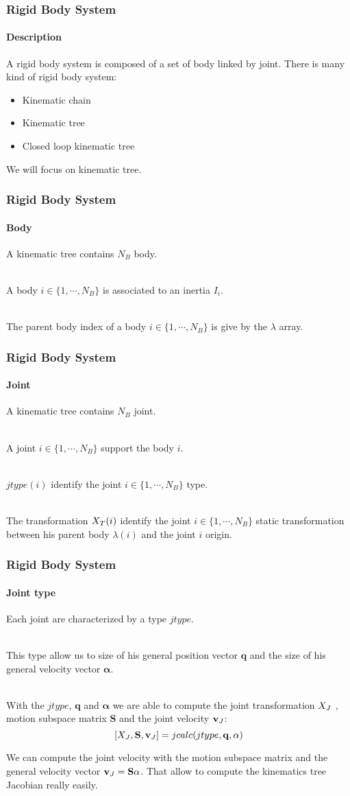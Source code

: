 \documentclass{beamer}
\begin{document}
  	\begin{frame}
		\frametitle{Rigid Body System}
		\framesubtitle{Description}
		A rigid body system is composed of a set of body linked by joint.
		There is many kind of rigid body system:
		\begin{itemize}
			\item Kinematic chain
			\item Kinematic tree
			\item Closed loop kinematic tree
		\end{itemize}
		We will focus on kinematic tree.
	\end{frame}
  	\begin{frame}
		\frametitle{Rigid Body System}
		\framesubtitle{Body}
		A kinematic tree contains $ N_B $ body.

		\hfill \\
		A body $ i \in \{1, \cdots, N_B\} $ is associated to an inertia $ I_i $.

		\hfill \\
		The parent body index of a body $ i \in \{1, \cdots, N_B\} $ is give by the $ \lambda $ array.
	\end{frame}
  	\begin{frame}
		\frametitle{Rigid Body System}
		\framesubtitle{Joint}
		A kinematic tree contains $ N_B $ joint.

		\hfill \\
		A joint $ i \in \{1, \cdots, N_B\} $ support the body $ i $.

		\hfill \\
		$ jtype(i) $ identify the joint $ i \in \{1, \cdots, N_B\} $ type.

		\hfill \\
	        The transformation $ X_T(i) $	identify the joint $ i \in \{1, \cdots, N_B\} $
		static transformation between his parent body $ \lambda(i) $ and the joint $ i $ origin.
	\end{frame}
  	\begin{frame}
		\frametitle{Rigid Body System}
		\framesubtitle{Joint type}
		Each joint are characterized by a type $ jtype $.

		\hfill \\
		This type allow us to size of his general position vector $ \mathbf{q} $ and the size
		of his general velocity vector $ \mathbf{\alpha} $.

		\hfill \\
		With the $ jtype $, $ \mathbf{q} $ and $ \mathbf{\alpha} $ we are able to compute the joint
		transformation $ X_J $ , motion subspace matrix $ \mathbf{S} $ and
		the joint velocity $ \mathbf{v}_J $:
		$$
		[X_J, \mathbf{S}, \mathbf{v}_J] = jcalc(jtype, \mathbf{q}, \mathbf{\alpha})
		$$

		We can compute the joint velocity with the motion subspace matrix and
		the general velocity vector $ \mathbf{v}_J = \mathbf{S}\mathbf{\alpha} $.
		That allow to compute the kinematics tree Jacobian really easily.
	\end{frame}
\end{document}
